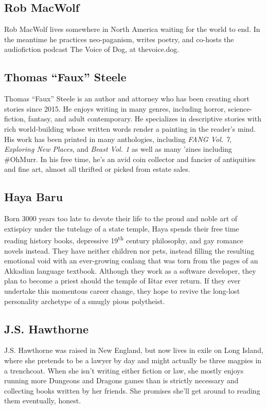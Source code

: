 \subsection*{Rob MacWolf}
Rob MacWolf lives somewhere in North America waiting for the world to end. In the meantime he practices neo-paganism, writes poetry, and co-hosts the audiofiction podcast The Voice of Dog, at thevoice.dog.

\subsection*{Thomas ``Faux'' Steele}
Thomas ``Faux'' Steele is an author and attorney who has been creating short stories since 2015. He enjoys writing in many genres, including horror, science-fiction, fantasy, and adult contemporary. He specializes in descriptive stories with rich world-building whose written words render a painting in the reader's mind. His work has been printed in many anthologies, including \emph{FANG Vol. 7}, \emph{Exploring New Places}, and \emph{Beast Vol. 1} as well as many 'zines including \#OhMurr. In his free time, he's an avid coin collector and fancier of antiquities and fine art, almost all thrifted or picked from estate sales.

\subsection*{Haya Baru}
Born 3000 years too late to devote their life to the proud and noble art of extispicy under the tutelage of a state temple, Haya spends their free time reading history books, depressive 19\textsuperscript{th} century philosophy, and gay romance novels instead. They have neither children nor pets, instead filling the resulting emotional void with an ever-growing conlang that was torn from the pages of an Akkadian language textbook. Although they work as a software developer, they plan to become a priest should the temple of Ištar ever return. If they ever undertake this momentous career change, they hope to revive the long-lost personality archetype of a smugly pious polytheist.

\subsection*{J.S. Hawthorne}
J.S. Hawthorne was raised in New England, but now lives in exile on Long Island, where she pretends to be a lawyer by day and might actually be three magpies in a trenchcoat. When she isn't writing either fiction or law, she mostly enjoys running more Dungeons and Dragons games than is strictly necessary and collecting books written by her friends. She promises she'll get around to reading them eventually, honest.

